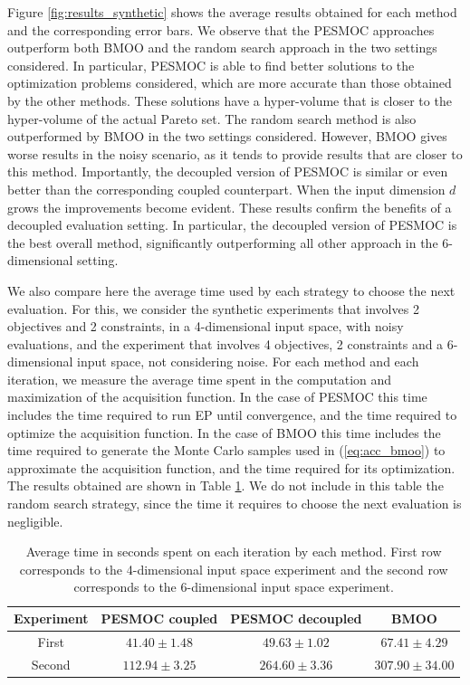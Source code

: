 \documentclass[review,preprint,12pt]{elsarticle}
\begin{document}
Figure \ref{fig:results_synthetic} shows the average results obtained for each method and the corresponding error bars.
We observe that the PESMOC approaches outperform both BMOO and the random search approach in the two settings considered. 
In particular, PESMOC is able to find better solutions to the optimization problems considered, which are more accurate than 
those obtained by the other methods. These solutions have a hyper-volume that is closer to the hyper-volume of the actual Pareto set.
The random search method is also outperformed by BMOO in the two settings considered. However, BMOO gives worse results 
in the noisy scenario, as it tends to provide results that are closer to this method. Importantly, 
the decoupled version of PESMOC is similar or even better than the corresponding coupled counterpart. When the input 
dimension $d$ grows the improvements become evident. These results confirm the benefits of a decoupled evaluation 
setting. In particular, the decoupled version of PESMOC is the best overall method, significantly outperforming all 
other approach in the $6$-dimensional setting.


We also compare here the average time used by each strategy to choose the next evaluation. For this, we consider 
the synthetic experiments that involves 2 objectives  and 2 constraints, in a 4-dimensional input space, with noisy 
evaluations, and the experiment that involves 4 objectives, 2 constraints and a 6-dimensional input space, not considering noise.
For each method and each iteration, we measure the average time spent in the computation and 
maximization of the acquisition function. In the case of PESMOC this time includes the time required to run EP until convergence, 
and the time required to optimize the acquisition function. In the case of BMOO this time includes the time required
to generate the Monte Carlo samples used in (\ref{eq:acc_bmoo}) to approximate the acquisition function, and the time required 
for its optimization. The results obtained are shown in Table \ref{table:times}. We do not include in this table
the random search strategy, since the time it requires to choose the next evaluation is negligible.

\begin{table}[htb]
\centering
\caption{Average time in seconds spent on each iteration by each method. First row corresponds to the 4-dimensional input space experiment and the second row corresponds to the 6-dimensional input space experiment.}
{\small
\begin{tabular}{c|c | c | c}
 \hline
 \bf{Experiment} & {\bf PESMOC coupled} & {\bf PESMOC decoupled} & {\bf BMOO}\\
 \hline
 First & $41.40 \pm 1.48$ & $49.63 \pm 1.02$ & $67.41 \pm 4.29$\\
 Second & $112.94 \pm 3.25$ & $264.60 \pm 3.36$ & $307.90 \pm 34.00$\\
 \hline
\end{tabular}
}
\label{table:times}
\end{table}
\end{document}
